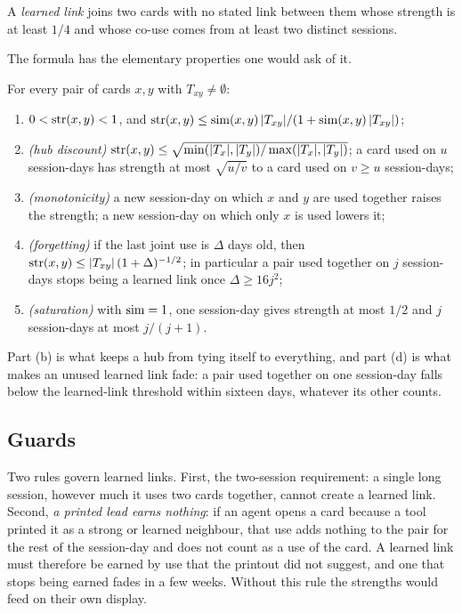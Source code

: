 \begin{definition}
A \emph{learned link} joins two cards with no stated link between them whose strength is at least $1/4$ and whose co-use comes from at least two distinct sessions.
\end{definition}

The formula has the elementary properties one would ask of it.

\begin{proposition}\label{prop:strength-bounds}
For every pair of cards $x,y$ with $T_{xy}\ne\emptyset$:
\begin{enumerate}[label=(\alph*)]
\item $0<\operatorname{str}(x,y)<1$, and $\operatorname{str}(x,y)\le\operatorname{sim}(x,y)\,|T_{xy}|/(1+\operatorname{sim}(x,y)\,|T_{xy}|)$;
\item \emph{(hub discount)} $\operatorname{str}(x,y)\le\sqrt{\min(|T_x|,|T_y|)/\max(|T_x|,|T_y|)}$; a card used on $u$ session-days has strength at most $\sqrt{u/v}$ to a card used on $v\ge u$ session-days;
\item \emph{(monotonicity)} a new session-day on which $x$ and $y$ are used together raises the strength; a new session-day on which only $x$ is used lowers it;
\item \emph{(forgetting)} if the last joint use is $\Delta$ days old, then $\operatorname{str}(x,y)\le|T_{xy}|\,(1+\Delta)^{-1/2}$; in particular a pair used together on $j$ session-days stops being a learned link once $\Delta\ge16j^2$;
\item \emph{(saturation)} with $\operatorname{sim}=1$, one session-day gives strength at most $1/2$ and $j$ session-days at most $j/(j+1)$.
\end{enumerate}
\end{proposition}

Part (b) is what keeps a hub from tying itself to everything, and part (d) is what makes an unused learned link fade: a pair used together on one session-day falls below the learned-link threshold within sixteen days, whatever its other counts.

\subsection{Guards}
Two rules govern learned links. First, the two-session requirement: a single long session, however much it uses two cards together, cannot create a learned link. Second, \emph{a printed lead earns nothing}: if an agent opens a card because a tool printed it as a strong or learned neighbour, that use adds nothing to the pair for the rest of the session-day and does not count as a use of the card. A learned link must therefore be earned by use that the printout did not suggest, and one that stops being earned fades in a few weeks. Without this rule the strengths would feed on their own display.

